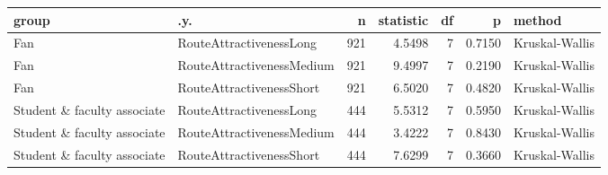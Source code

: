 \begin{tabular}{llrrrrl}
  \hline
group & .y. & n & statistic & df & p & method \\ 
  \hline
Fan & RouteAttractivenessLong &   921 & 4.5498 &     7 & 0.7150 & Kruskal-Wallis \\ 
  Fan & RouteAttractivenessMedium &   921 & 9.4997 &     7 & 0.2190 & Kruskal-Wallis \\ 
  Fan & RouteAttractivenessShort &   921 & 6.5020 &     7 & 0.4820 & Kruskal-Wallis \\ 
  Student \& faculty associate & RouteAttractivenessLong &   444 & 5.5312 &     7 & 0.5950 & Kruskal-Wallis \\ 
  Student \& faculty associate & RouteAttractivenessMedium &   444 & 3.4222 &     7 & 0.8430 & Kruskal-Wallis \\ 
  Student \& faculty associate & RouteAttractivenessShort &   444 & 7.6299 &     7 & 0.3660 & Kruskal-Wallis \\ 
   \hline
\end{tabular}
